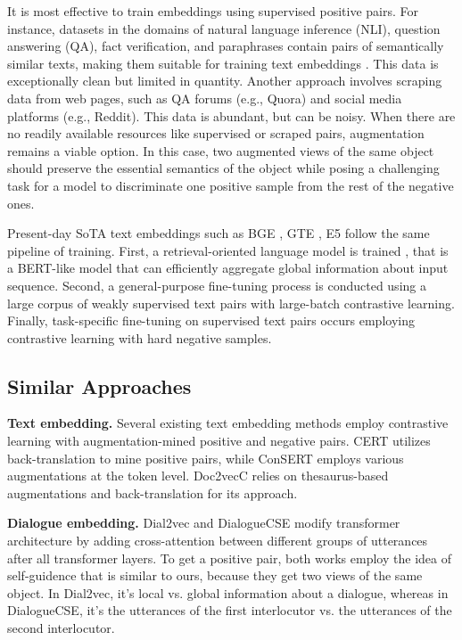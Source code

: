 \documentclass{article}
\begin{document}
It is most effective to train embeddings using supervised positive pairs. For instance, datasets in the domains of natural language inference (NLI), question answering (QA), fact verification, and paraphrases contain pairs of semantically similar texts, making them suitable for training text embeddings \cite{li2023general}. This data is exceptionally clean but limited in quantity. Another approach involves scraping data from web pages, such as QA forums (e.g., Quora) and social media platforms (e.g., Reddit). This data is abundant, but can be noisy. When there are no readily available resources like supervised or scraped pairs, augmentation remains a viable option. In this case, two augmented views of the same object should preserve the essential semantics of the object while posing a challenging task for a model to discriminate one positive sample from the rest of the negative ones. 

Present-day SoTA text embeddings such as BGE \cite{xiao2023cpack}, GTE \cite{li2023general}, E5 \cite{wang2022text} follow the same pipeline of training. First, a retrieval-oriented language model is trained \cite{xiao2022retromae, gao-callan-2021-condenser}, that is a BERT-like model that can efficiently aggregate global information about input sequence. Second, a general-purpose fine-tuning process is conducted using a large corpus of weakly supervised text pairs with large-batch contrastive learning. Finally, task-specific fine-tuning on supervised text pairs occurs employing contrastive learning with hard negative samples.

\subsection{Similar Approaches}

\textbf{Text embedding.} Several existing text embedding methods employ contrastive learning with augmentation-mined positive and negative pairs. CERT \cite{fang2020cert} utilizes back-translation to mine positive pairs, while ConSERT \cite{yan-etal-2021-consert} employs various augmentations at the token level. Doc2vecC \cite{luo2021unsupervised} relies on thesaurus-based augmentations and back-translation for its approach.

\textbf{Dialogue embedding.} Dial2vec \cite{liu2022dial2vec} and DialogueCSE \cite{liu2021dialoguecse} modify transformer architecture by adding cross-attention between different groups of utterances after all transformer layers. To get a positive pair, both works employ the idea of self-guidence that is similar to ours, because they get two views of the same object. In Dial2vec, it's local vs. global information about a dialogue, whereas in DialogueCSE, it's the utterances of the first interlocutor vs. the utterances of the second interlocutor.
\end{document}
